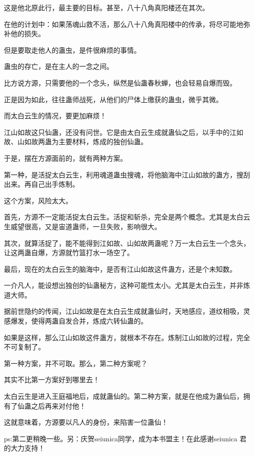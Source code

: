 \begin{this_body}
这是他北原此行，最主要的目标。甚至，八十八角真阳楼还在其次。

在他的计划中：如果荡魂山救不活，那么八十八角真阳楼中的传承，将尽可能地弥补他的损失。

但是要取走他人的蛊虫，是件很麻烦的事情。

蛊虫的存亡，是在主人的一念之间。

比方说方源，只需要他的一个念头，纵然是仙蛊春秋蝉，也会轻易自爆而毁。

正是因为如此，往往蛊师战死，从他们的尸体上缴获的蛊虫，微乎其微。

而太白云生的情况，要更加麻烦！

江山如故这只仙蛊，还没有问世。它是由太白云生成就蛊仙之后，以手中的江如故、山如故两蛊为主要材料，炼成的独创仙蛊。

于是，摆在方源面前的，就有两种方案。

第一种，是活捉太白云生，利用魂道蛊虫搜魂，将他脑海中江山如故的蛊方，搜刮出来。再自己出手炼制。

这个方案，风险太大。

首先，方源不一定能活捉太白云生。活捉和斩杀，完全是两个概念。尤其是太白云生威望很高，又是宙道蛊师，一旦失败，影响很大。

其次，就算活捉了，能不能得到江如故、山如故两蛊呢？万一太白云生一个念头，让这两蛊自爆，方源就竹篮打水一场空了。

最后，现在的太白云生的脑海中，是否有江山如故这件蛊方，还是个未知数。

一介凡人，能设想出独创的仙蛊秘方，这种可能性太小。尤其是太白云生，并非炼道大师。

据前世隐约的传闻，江山如故是在太白云生成就蛊仙时，天地感应，道纹相吸，灵感爆发，使得两蛊自发合并，炼成六转仙蛊的。

如果是这样，那么江山如故这件蛊方，就根本不存在。炼制江山如故的过程，完全不可复制了。

第一种方案，并不可取。那么，第二种方案呢？

其实不比第一方案好到哪里去！

太白云生是进入王庭福地后，成就蛊仙的。第二种方案，就是在他成为蛊仙后，拥有了仙蛊之后再来对付他！

这就意味着，方源要以凡人的身份，来陷害一位蛊仙！

ps:第二更稍晚一些。另：庆贺seiunica同学，成为本书盟主！在此感谢seiunica 君的大力支持！

\end{this_body}

